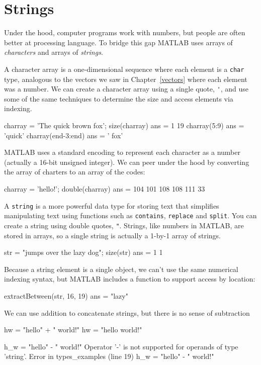 \section{Strings}

Under the hood, computer programs work with numbers, but people are often better at processing language.  To bridge this gap MATLAB uses arrays of \emph{characters} and arrays of \emph{strings}.

A character array is a one-dimensional sequence where each element is a \lstinline{char} type, analogous to the vectors we saw in Chapter~\ref{vectors} where each element was a number.   We can create a character array using a single quote, \lstinline{'}, and use some of the same techniques to determine the size and access elements via indexing.

\begin{code}
    charray = 'The quick brown fox';
    size(charray)
    ans =
         1    19
    charray(5:9)
    ans =
        'quick'
    charray(end-3:end)
    ans =
        ' fox'
\end{code}   

MATLAB uses a standard encoding to represent each character as a number (actually a 16-bit unsigned integer).  We can peer under the hood by converting the array of charters to an array of the codes:
\begin{code}
charray = 'hello!';
double(charray)
ans =
   104   101   108   108   111    33
\end{code}

A \lstinline{string} is a more powerful data type for storing text that simplifies manipulating text using functions such as \lstinline{contains}, \lstinline{replace} and \lstinline{split}.  You can create a string using double quotes, \lstinline{"}.  Strings, like numbers in MATLAB, are stored in arrays, so a single string is actually a 1-by-1 array of strings.

\begin{code}
str = "jumps over the lazy dog";
size(str)
ans =
     1     1
\end{code}
Because a string element is a single object, we can't use the same numerical indexing syntax, but MATLAB includes a function to support access by location:
\begin{code}
extractBetween(str, 16, 19)
ans = 
    "lazy"
\end{code}
We can use addition to concatenate strings, but there is no sense of subtraction
\begin{code}
hw = "hello" + " world!"
hw = 
    "hello world!"

h_w = "hello" - " world!"
Operator '-' is not supported for operands of type 'string'.
Error in types_examples (line 19)
h_w = "hello" - " world!"
\end{code}

